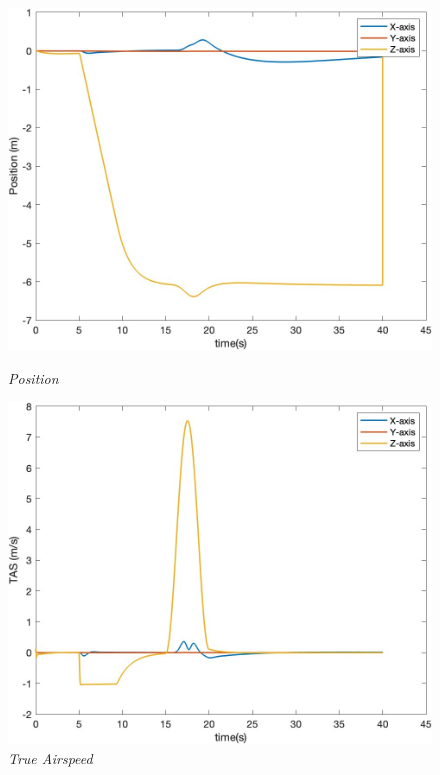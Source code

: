 \begin{figure}[htbp]
  \centering
  \begin{minipage}[b]{0.45\textwidth}
    \centering
    \includegraphics[width=\textwidth]{Images/Gust/VTOL pulse/1 position_4.jpg}
    \caption*{\textit{Position}}
  \end{minipage}
  \hfil
  \begin{minipage}[b]{0.45\textwidth}
    \centering
    \includegraphics[width=\textwidth]{Images/Gust/VTOL pulse/2 airspeed_4.jpg}
    \caption*{\textit{True Airspeed}}
  \end{minipage}

\end{figure}
